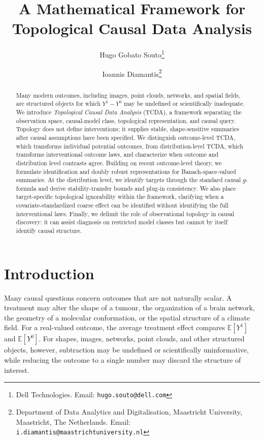 \documentclass[11pt,a4paper]{article}
\title{A Mathematical Framework for Topological Causal Data Analysis}
\author{
Hugo Gobato Souto\thanks{Dell Technologies. Email: \texttt{hugo.souto@dell.com}}
\and
Ioannis Diamantis\thanks{Department of Data Analytics and Digitalisation, Maastricht University, Maastricht, The Netherlands. Email: \texttt{i.diamantis@maastrichtuniversity.nl}}
}
\date{}
\theoremstyle{plain}
\theoremstyle{definition}
\theoremstyle{remark}
\newcommand{\1}{\mathbbm{1}}
\begin{document}
\maketitle

\begin{abstract}
Many modern outcomes, including images, point clouds, networks, and spatial fields, are structured objects for which \(Y^1-Y^0\) may be undefined or scientifically inadequate. We introduce \emph{Topological Causal Data Analysis} (TCDA), a framework separating the observation space, causal-model class, topological representation, and causal query. Topology does not define interventions; it supplies stable, shape-sensitive summaries after causal assumptions have been specified. We distinguish outcome-level TCDA, which transforms individual potential outcomes, from distribution-level TCDA, which transforms interventional outcome laws, and characterize when outcome and distribution level contrasts agree. Building on recent outcome-level theory, we formulate identification and doubly robust representations for Banach-space-valued summaries. At the distribution level, we identify targets through the standard causal \(g\)-formula and derive stability-transfer bounds and plug-in consistency. We also place target-specific topological ignorability within the framework, clarifying when a covariate-standardized coarse effect can be identified without identifying the full interventional laws. Finally, we delimit the role of observational topology in causal discovery: it can assist diagnosis on restricted model classes but cannot by itself identify causal structure.
\end{abstract}






\section{Introduction}
\label{sec:introduction}

Many causal questions concern outcomes that are not naturally scalar. A treatment may alter the shape of a tumour, the organization of a brain network, the geometry of a molecular conformation, or the spatial structure of a climate field. For a real-valued outcome, the average treatment effect compares
\(\mathbb E[Y^1]\) and \(\mathbb E[Y^0]\). For shapes, images, networks, point clouds, and other structured objects, however, subtraction may be undefined or scientifically uninformative, while reducing the outcome to a single number may discard the structure of interest.
\end{document}
